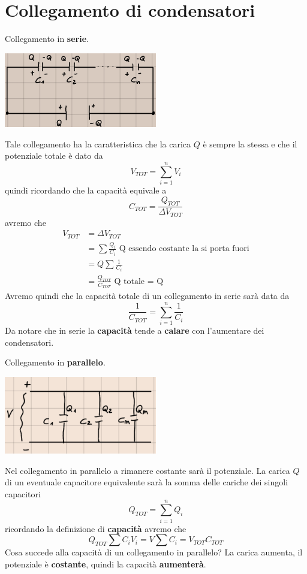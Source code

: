 \documentclass[a4paper, 12pt]{book}
\theoremstyle{plain}
\begin{document}
\section{Collegamento di condensatori}

Collegamento in \textbf{serie}.

\begin{center}
    \includegraphics[width=0.5\textwidth]{coll_serie.jpg}
\end{center}
Tale collegamento ha la caratteristica che la carica 
$Q$ è sempre la stessa e che il potenziale totale è dato 
da \[ V_{TOT} = \sum_{i = 1}^n V_i \] quindi ricordando 
che la capacità equivale a \[ C_{TOT} = \frac{Q_{TOT}}{\Delta V_{TOT}} \]
avremo che 
\[
    \begin{split}
        V_{TOT} &= \Delta V_{TOT} \\
        &= \sum \frac{Q_i}{C_i} \textrm{ Q essendo costante la si porta fuori} \\
        &= Q \sum \frac{1}{C_i} \\
        &= \frac{Q_{TOT}}{C_{TOT}} \textrm{ Q totale = Q}
    \end{split}
\]
Avremo quindi che la capacità totale di un collegamento 
in serie sarà data da \[ \frac{1}{C_{TOT}} = \sum_{i = 1}^n \frac{1}{C_i} \]
Da notare che in serie la \textbf{capacità} tende a \textbf{calare} con 
l'aumentare dei condensatori.

Collegamento in \textbf{parallelo}.

\begin{center}
    \includegraphics[width=0.5\textwidth]{coll_parall.png}
\end{center}
Nel collegamento in parallelo a rimanere costante sarà 
il potenziale. La carica $Q$ di un eventuale capacitore 
equivalente sarà la somma delle cariche dei singoli 
capacitori \[Q_{TOT} = \sum_{i = 1}^n Q_i \] ricordando 
la definizione di \textbf{capacità} avremo che \[ Q_{TOT}
\sum C_i V_i = V \sum C_i = V_{TOT} C_{TOT} \] Cosa succede 
alla capacità di un collegamento in parallelo? La carica 
aumenta, il potenziale è \textbf{costante}, quindi la 
capacità \textbf{aumenterà}.
\end{document}
